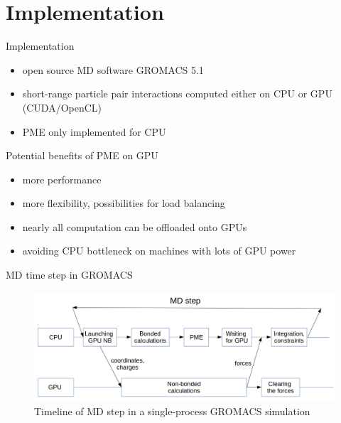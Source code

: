 \documentclass[11pt]{beamer}
\begin{document}

\section{Implementation}
\begin{frame}{Implementation}
\begin{itemize}
\item open source MD software GROMACS 5.1
\item short-range particle pair interactions computed either on CPU or GPU (CUDA/OpenCL) 
\item PME only implemented for CPU
\end{itemize}
\end{frame}

\begin{frame}{Potential benefits of PME on GPU}
\begin{itemize}
\item more performance
\item more flexibility, possibilities for load balancing 
\item nearly all computation can be offloaded onto GPUs
\item avoiding CPU bottleneck on machines with lots of GPU power  
\end{itemize}
\end{frame}

\begin{frame}{MD time step in GROMACS}
\begin{figure}
    \centering
    \includegraphics[width=1\textwidth]{pics/mdstep-orig.png}
    \caption{Timeline of MD step in a single-process GROMACS simulation}
    \label{fig:step-orig}
\end{figure}
\FloatBarrier
\end{frame}
\end{document}
